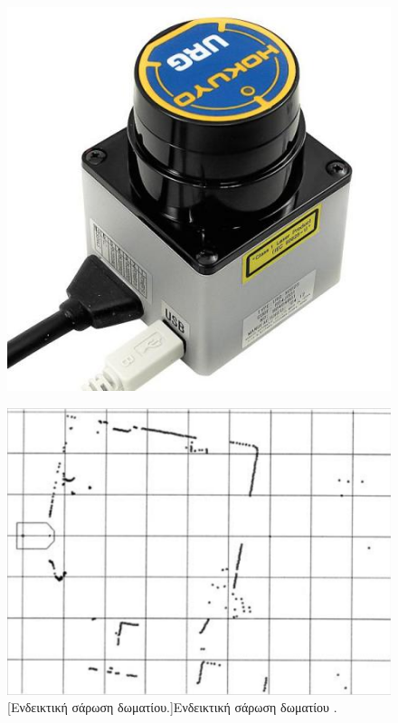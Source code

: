 \begin{enumerate}
\begin{figure}[!ht]
	\begin{minipage}[t]{.49\textwidth}
 		\centering
		\includegraphics[width=0.6\linewidth]{Chapters/Chapter2/Figures/hokuyo.jpg}
		\label{fig:hokuyo}
	\end{minipage}
	\begin{minipage}[t]{.49\textwidth}		
		\centering
 		\centering
		\includegraphics[width=0.75\linewidth]{Chapters/Chapter2/Figures/laser_scan.png}
		[Ενδεικτική σάρωση δωματίου.]{Ενδεικτική σάρωση δωματίου \cite{autonomous_land_vehicles}.}
		\label{fig:hokuyo_rays}
	\end{minipage}
\end{figure}

\bigskip


\end{enumerate}
